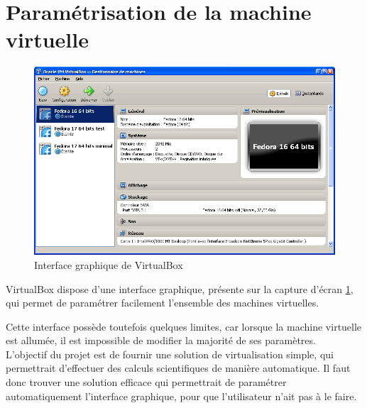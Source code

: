 \section{Paramétrisation de la machine virtuelle}
\label{Paramétrisation de la machine virtuelle}

\begin{figure}[!h]
	\center
	\includegraphics[scale=0.5]{img/VirtualBox.png}
	\caption{Interface graphique de VirtualBox}
	\label{Interface graphique de VirtualBox}
\end{figure}

VirtualBox dispose d'une interface graphique, présente sur la capture d'écran \ref{Interface graphique de VirtualBox}, qui permet de paramétrer facilement l'ensemble des machines virtuelles.

Cette interface possède toutefois quelques limites, car lorsque la machine virtuelle est allumée, il est impossible de modifier la majorité de ses paramètres.
\\


L'objectif du projet est de fournir une solution de virtualisation simple, qui permettrait d'effectuer des calculs scientifiques de manière automatique.
Il faut donc trouver une solution efficace qui permettrait de paramétrer automatiquement l'interface graphique, pour que l'utilisateur n'ait pas à le faire.
\\





